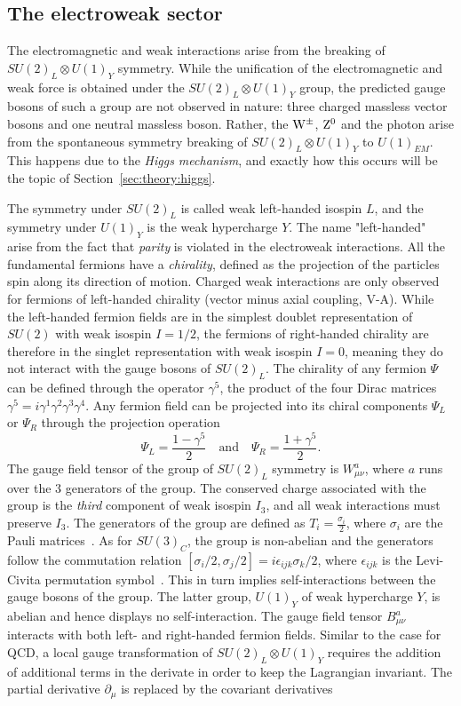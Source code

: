 \subsection{The electroweak sector}
\label{sec:theory:ew}
The electromagnetic and weak interactions arise from the breaking of $SU (2)_L \otimes U(1)_Y$ symmetry. While the unification of the electromagnetic and weak force is obtained under the $SU (2)_L \otimes U(1)_Y$ group, the predicted gauge bosons of such a group are not observed in nature: three charged massless vector bosons and one neutral massless boson. Rather, the $\mathrm{W}^{\pm}$, $\mathrm{Z}^{0}$ and the photon arise from the spontaneous symmetry breaking of $SU (2)_L \otimes U(1)_Y$ to $U(1)_{EM}$. This happens due to the \emph{Higgs mechanism}, and exactly how this occurs will be the topic of Section~\ref{sec:theory:higgs}.\par
The symmetry under $SU (2)_L$ is called weak left-handed isospin $L$, and the symmetry under $U(1)_Y$ is the weak hypercharge $Y$. The name "left-handed" arise from the fact that \emph{parity} is violated in the electroweak interactions. All the fundamental fermions have a \emph{chirality}, defined as the projection of the particles spin along its direction of motion. Charged weak interactions are only observed for fermions of left-handed chirality (vector minus axial coupling, V-A). While the left-handed fermion fields are in the simplest doublet representation of $SU(2)$ with weak isospin $I=1/2$, the fermions of right-handed chirality are therefore in the singlet representation with weak isospin $I=0$, meaning they do not interact with the gauge bosons of $SU (2)_L$. The chirality of any fermion $\Psi$ can be defined through the operator $\gamma^5$, the product of the four Dirac matrices~\cite{Pauli:1936gd} $\gamma^5=i\gamma^1\gamma^2\gamma^3\gamma^4$. Any fermion field can be projected into its chiral components $\Psi_L$ or $\Psi_R$ through the projection operation
\begin{equation}
  \Psi_L = \frac{1-\gamma^5}{2} \quad \textrm{and} \quad \Psi_R = \frac{1+\gamma^5}{2}.
  \end{equation}
The gauge field tensor of the group of $SU (2)_L$ symmetry is $W_{\mu\nu}^a$, where $a$ runs over the 3 generators of the group. The conserved charge associated with the group is the \emph{third} component of weak isospin $I_3$, and all weak interactions must preserve $I_3$. The generators of the group are defined as $T_i=\frac{\sigma_i}{2}$, where $\sigma_i$ are the Pauli matrices~\cite{inbook}. As for $SU (3)_C$, the group is non-abelian and the generators follow the commutation relation $[\sigma_i/2,\sigma_j/2]=i \epsilon_{ijk} \sigma_k/2$, where $\epsilon_{ijk}$ is the Levi-Civita permutation symbol~\cite{Duplij2004}. This in turn implies self-interactions between the gauge bosons of the group. The latter group, $U(1)_Y$ of weak hypercharge $Y$, is abelian and hence displays no self-interaction. The gauge field tensor $B_{\mu\nu}^a$ interacts with both left- and right-handed fermion fields. Similar to the case for QCD, a local gauge transformation of $SU (2)_L \otimes U(1)_Y$ requires the addition of additional terms in the derivate in order to keep the Lagrangian invariant. The partial derivative $\partial_{\mu}$ is replaced by the covariant derivatives
